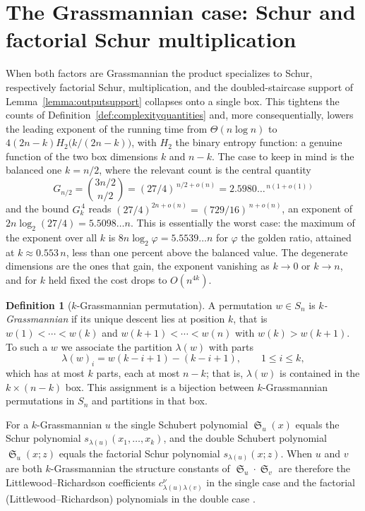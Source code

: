\documentclass{amsart}
\theoremstyle{definition}
\newtheorem{definition}[lemma]{Definition}
\theoremstyle{remark}
\numberwithin{equation}{section}
\DeclareMathOperator{\sch}{\mathfrak{S}}
\begin{document}
\section{The Grassmannian case: Schur and factorial Schur multiplication} \label{sec:grassmannian}

When both factors are Grassmannian the product specializes to Schur, respectively factorial Schur, multiplication, and the doubled-staircase support of Lemma~\ref{lemma:outputsupport} collapses onto a single box. This tightens the counts of Definition~\ref{def:complexityquantities} and, more consequentially, lowers the leading exponent of the running time from $\Theta(n\log n)$ to $4(2n-k)H_2\!\big(k/(2n-k)\big)$, with $H_2$ the binary entropy function: a genuine function of the two box dimensions $k$ and $n-k$. The case to keep in mind is the balanced one $k=n/2$, where the relevant count is the central quantity
$$G_{n/2}=\binom{3n/2}{n/2}=(27/4)^{\,n/2+o(n)}=2.5980\ldots^{\,n(1+o(1))}$$
and the bound $G_k^{\,4}$ reads $(27/4)^{2n+o(n)}=(729/16)^{\,n+o(n)}$, an exponent of $2n\log_2(27/4)=5.5098\ldots n$. This is essentially the worst case: the maximum of the exponent over all $k$ is $8n\log_2\varphi=5.5539\ldots n$ for $\varphi$ the golden ratio, attained at $k\approx 0.553\,n$, less than one percent above the balanced value. The degenerate dimensions are the ones that gain, the exponent vanishing as $k\to 0$ or $k\to n$, and for $k$ held fixed the cost drops to $O(n^{4k})$.

\begin{definition}[$k$-Grassmannian permutation] \label{def:grassmannian}
A permutation $w\in S_n$ is \emph{$k$-Grassmannian} if its unique descent lies at position $k$, that is $w(1)<\cdots<w(k)$ and $w(k+1)<\cdots<w(n)$ with $w(k)>w(k+1)$. To such a $w$ we associate the partition $\lambda(w)$ with parts
$$\lambda(w)_i=w(k-i+1)-(k-i+1),\qquad 1\leq i\leq k,$$
which has at most $k$ parts, each at most $n-k$; that is, $\lambda(w)$ is contained in the $k\times(n-k)$ box. This assignment is a bijection between $k$-Grassmannian permutations in $S_n$ and partitions in that box.
\end{definition}

For a $k$-Grassmannian $u$ the single Schubert polynomial $\sch_u(x)$ equals the Schur polynomial $s_{\lambda(u)}(x_1,\ldots,x_k)$, and the double Schubert polynomial $\sch_u(x;z)$ equals the factorial Schur polynomial $s_{\lambda(u)}(x;z)$. When $u$ and $v$ are both $k$-Grassmannian the structure constants of $\sch_u\cdot\sch_v$ are therefore the Littlewood--Richardson coefficients $c_{\lambda(u)\lambda(v)}^{\nu}$ in the single case \cite{buch2002LRgrass} and the factorial (Littlewood--Richardson) polynomials in the double case \cite{molev1999littlewood,samuelmolev}.
\end{document}
